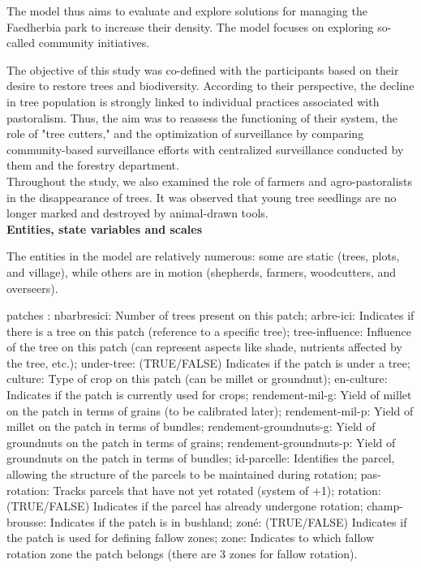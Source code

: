 \documentclass{article}
\begin{document}
        The model thus aims to evaluate and explore solutions for managing the Faedherbia park to increase their density. The model focuses on exploring so-called community initiatives.

        The objective of this study was co-defined with the participants based on their desire to restore trees and biodiversity. According to their perspective, the decline in tree population is strongly linked to individual practices associated with pastoralism. Thus, the aim was to reassess the functioning of their system, the role of "tree cutters," and the optimization of surveillance by comparing community-based surveillance efforts with centralized surveillance conducted by them and the forestry department.\\

        Throughout the study, we also examined the role of farmers and agro-pastoralists in the disappearance of trees. It was observed that young tree seedlings are no longer marked and destroyed by animal-drawn tools.\\

        \textbf{Entities, state variables and scales}

        The entities in the model are relatively numerous: some are static (trees, plots, and village), while others are in motion (shepherds, farmers, woodcutters, and overseers). 

        patches : nbarbresici: Number of trees present on this patch; arbre-ici: Indicates if there is a tree on this patch (reference to a specific tree); tree-influence: Influence of the tree on this patch (can represent aspects like shade, nutrients affected by the tree, etc.); under-tree: (TRUE/FALSE) Indicates if the patch is under a tree; culture: Type of crop on this patch (can be millet or groundnut); en-culture: Indicates if the patch is currently used for crops; rendement-mil-g: Yield of millet on the patch in terms of grains (to be calibrated later); rendement-mil-p: Yield of millet on the patch in terms of bundles; rendement-groundnuts-g: Yield of groundnuts on the patch in terms of grains; rendement-groundnuts-p: Yield of groundnuts on the patch in terms of bundles; id-parcelle: Identifies the parcel, allowing the structure of the parcels to be maintained during rotation; pas-rotation: Tracks parcels that have not yet rotated (system of +1); rotation: (TRUE/FALSE) Indicates if the parcel has already undergone rotation; champ-brousse: Indicates if the patch is in bushland; zoné: (TRUE/FALSE) Indicates if the patch is used for defining fallow zones; zone: Indicates to which fallow rotation zone the patch belongs (there are 3 zones for fallow rotation).
\end{document}
